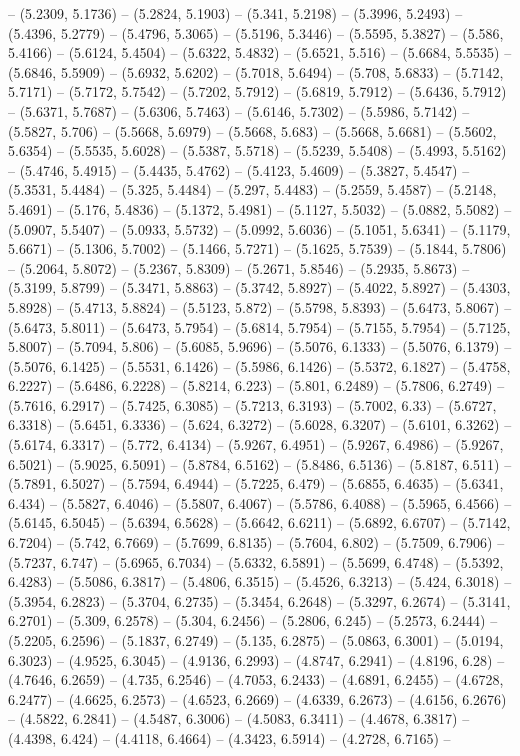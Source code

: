 -- (5.2309, 5.1736) -- (5.2824, 5.1903) -- (5.341, 5.2198) -- (5.3996, 5.2493) -- (5.4396, 5.2779) -- (5.4796, 5.3065) -- (5.5196, 5.3446) -- (5.5595, 5.3827) -- (5.586, 5.4166) -- (5.6124, 5.4504) -- (5.6322, 5.4832) -- (5.6521, 5.516) -- (5.6684, 5.5535) -- (5.6846, 5.5909) -- (5.6932, 5.6202) -- (5.7018, 5.6494) -- (5.708, 5.6833) -- (5.7142, 5.7171) -- (5.7172, 5.7542) -- (5.7202, 5.7912) -- (5.6819, 5.7912) -- (5.6436, 5.7912) -- (5.6371, 5.7687) -- (5.6306, 5.7463) -- (5.6146, 5.7302) -- (5.5986, 5.7142) -- (5.5827, 5.706) -- (5.5668, 5.6979) -- (5.5668, 5.683) -- (5.5668, 5.6681) -- (5.5602, 5.6354) -- (5.5535, 5.6028) -- (5.5387, 5.5718) -- (5.5239, 5.5408) -- (5.4993, 5.5162) -- (5.4746, 5.4915) -- (5.4435, 5.4762) -- (5.4123, 5.4609) -- (5.3827, 5.4547) -- (5.3531, 5.4484) -- (5.325, 5.4484) -- (5.297, 5.4483) -- (5.2559, 5.4587) -- (5.2148, 5.4691) -- (5.176, 5.4836) -- (5.1372, 5.4981) -- (5.1127, 5.5032) -- (5.0882, 5.5082) -- (5.0907, 5.5407) -- (5.0933, 5.5732) -- (5.0992, 5.6036) -- (5.1051, 5.6341) -- (5.1179, 5.6671) -- (5.1306, 5.7002) -- (5.1466, 5.7271) -- (5.1625, 5.7539) -- (5.1844, 5.7806) -- (5.2064, 5.8072) -- (5.2367, 5.8309) -- (5.2671, 5.8546) -- (5.2935, 5.8673) -- (5.3199, 5.8799) -- (5.3471, 5.8863) -- (5.3742, 5.8927) -- (5.4022, 5.8927) -- (5.4303, 5.8928) -- (5.4713, 5.8824) -- (5.5123, 5.872) -- (5.5798, 5.8393) -- (5.6473, 5.8067) -- (5.6473, 5.8011) -- (5.6473, 5.7954) -- (5.6814, 5.7954) -- (5.7155, 5.7954) -- (5.7125, 5.8007) -- (5.7094, 5.806) -- (5.6085, 5.9696) -- (5.5076, 6.1333) -- (5.5076, 6.1379) -- (5.5076, 6.1425) -- (5.5531, 6.1426) -- (5.5986, 6.1426) -- (5.5372, 6.1827) -- (5.4758, 6.2227) -- (5.6486, 6.2228) -- (5.8214, 6.223) -- (5.801, 6.2489) -- (5.7806, 6.2749) -- (5.7616, 6.2917) -- (5.7425, 6.3085) -- (5.7213, 6.3193) -- (5.7002, 6.33) -- (5.6727, 6.3318) -- (5.6451, 6.3336) -- (5.624, 6.3272) -- (5.6028, 6.3207) -- (5.6101, 6.3262) -- (5.6174, 6.3317) -- (5.772, 6.4134) -- (5.9267, 6.4951) -- (5.9267, 6.4986) -- (5.9267, 6.5021) -- (5.9025, 6.5091) -- (5.8784, 6.5162) -- (5.8486, 6.5136) -- (5.8187, 6.511) -- (5.7891, 6.5027) -- (5.7594, 6.4944) -- (5.7225, 6.479) -- (5.6855, 6.4635) -- (5.6341, 6.434) -- (5.5827, 6.4046) -- (5.5807, 6.4067) -- (5.5786, 6.4088) -- (5.5965, 6.4566) -- (5.6145, 6.5045) -- (5.6394, 6.5628) -- (5.6642, 6.6211) -- (5.6892, 6.6707) -- (5.7142, 6.7204) -- (5.742, 6.7669) -- (5.7699, 6.8135) -- (5.7604, 6.802) -- (5.7509, 6.7906) -- (5.7237, 6.747) -- (5.6965, 6.7034) -- (5.6332, 6.5891) -- (5.5699, 6.4748) -- (5.5392, 6.4283) -- (5.5086, 6.3817) -- (5.4806, 6.3515) -- (5.4526, 6.3213) -- (5.424, 6.3018) -- (5.3954, 6.2823) -- (5.3704, 6.2735) -- (5.3454, 6.2648) -- (5.3297, 6.2674) -- (5.3141, 6.2701) -- (5.309, 6.2578) -- (5.304, 6.2456) -- (5.2806, 6.245) -- (5.2573, 6.2444) -- (5.2205, 6.2596) -- (5.1837, 6.2749) -- (5.135, 6.2875) -- (5.0863, 6.3001) -- (5.0194, 6.3023) -- (4.9525, 6.3045) -- (4.9136, 6.2993) -- (4.8747, 6.2941) -- (4.8196, 6.28) -- (4.7646, 6.2659) -- (4.735, 6.2546) -- (4.7053, 6.2433) -- (4.6891, 6.2455) -- (4.6728, 6.2477) -- (4.6625, 6.2573) -- (4.6523, 6.2669) -- (4.6339, 6.2673) -- (4.6156, 6.2676) -- (4.5822, 6.2841) -- (4.5487, 6.3006) -- (4.5083, 6.3411) -- (4.4678, 6.3817) -- (4.4398, 6.424) -- (4.4118, 6.4664) -- (4.3423, 6.5914) -- (4.2728, 6.7165) -- 